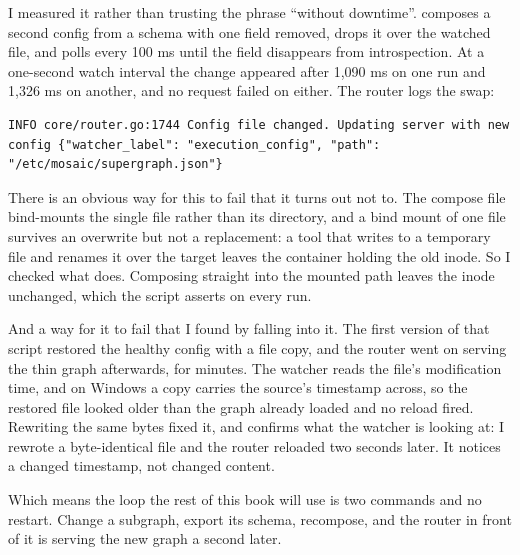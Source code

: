 I measured it rather than trusting the phrase \enquote{without downtime}.
 composes a second config from a
schema with one field removed, drops it over the watched file, and polls every
100 ms until the field disappears from introspection. At a one-second watch
interval the change appeared after 1{,}090 ms on one run and 1{,}326 ms on
another, and no request failed on either. The router logs the swap:

\begin{verbatim}
INFO core/router.go:1744 Config file changed. Updating server with new config {"watcher_label": "execution_config", "path": "/etc/mosaic/supergraph.json"}
\end{verbatim}

There is an obvious way for this to fail that it turns out not to. The compose
file bind-mounts the single file rather than its directory, and a bind mount of
one file survives an overwrite but not a replacement: a tool that writes to a
temporary file and renames it over the target leaves the container holding the
old inode. So I checked what  does. Composing straight into the
mounted path leaves the inode unchanged, which the script asserts on every run.

%
And a way for it to fail that I found by falling into it. The first version of
that script restored the healthy config with a file copy, and the router went
on serving the thin graph afterwards, for minutes. The watcher reads the file's
modification time, and on Windows a copy carries the source's timestamp across,
so the restored file looked older than the graph already loaded and no reload
fired. Rewriting the same bytes fixed it, and confirms what the watcher is
looking at: I rewrote a byte-identical file and the router reloaded two seconds
later. It notices a changed timestamp, not changed content.

Which means the loop the rest of this book will use is two commands and no
restart. Change a subgraph, export its schema, recompose, and the router in
front of it is serving the new graph a second later.

%
